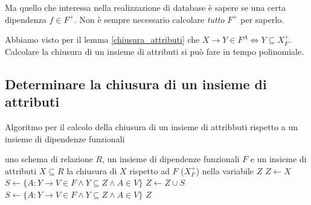 Ma quello che interessa nella realizzazione di database \`e sapere se una certa dipendenza $f \in F^+$. Non \`e sempre necessario calcolare \emph{tutto} $F^+$ per saperlo.

Abbiamo visto per il lemma \ref{chiusura_attributi} che $X \to Y \in F^A \iff Y \subseteq X^+_F$. Calcolare la chiusura di un insieme di attributi si pu\`o fare in tempo polinomiale.

\subsection{Determinare la chiusura di un insieme di attributi}


\begin{algorithm}[ht]
\caption{Algoritmo per il calcolo della chiusura di un insieme di attribbuti rispetto a un insieme di dipendenze funzionali}
\label{algoritmo_chiusura}
\begin{algorithmic}
\Require uno schema di relazione $R$, un insieme di dipendenze funzionali $F$ e un insieme di attributi $X \subseteq R$
\Ensure la chiusura di $X$ rispetto ad $F$ ($X^+_F$) nella variabile $Z$
\State $Z\gets X$
\State $S\gets \{ A : Y \to V \in F \land Y \subseteq Z \land A \in V \}$
    \State $Z\gets Z \cup S$
    \State $S\gets \{ A : Y \to V \in F \land Y \subseteq Z \land A \in V \}$
\EndWhile
\State \Return $Z$
\end{algorithmic}
\end{algorithm}

